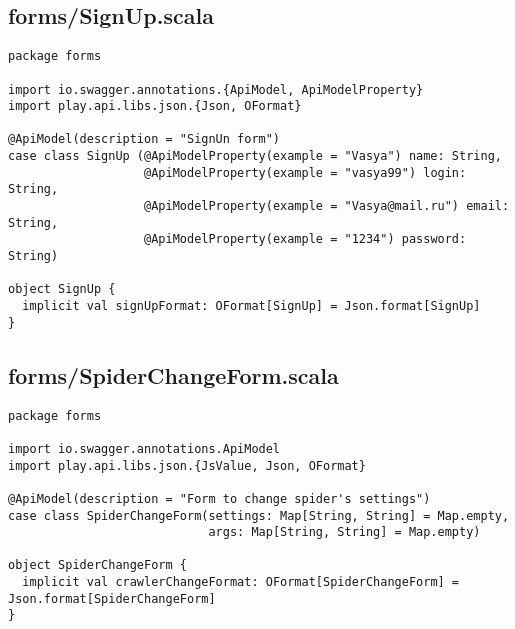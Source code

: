 \subsection{forms/SignUp.scala}
\begin{lstlisting}
package forms

import io.swagger.annotations.{ApiModel, ApiModelProperty}
import play.api.libs.json.{Json, OFormat}

@ApiModel(description = "SignUn form")
case class SignUp (@ApiModelProperty(example = "Vasya") name: String,
                   @ApiModelProperty(example = "vasya99") login: String,
                   @ApiModelProperty(example = "Vasya@mail.ru") email: String,
                   @ApiModelProperty(example = "1234") password: String)

object SignUp {
  implicit val signUpFormat: OFormat[SignUp] = Json.format[SignUp]
}\end{lstlisting}
\subsection{forms/SpiderChangeForm.scala}
\begin{lstlisting}
package forms

import io.swagger.annotations.ApiModel
import play.api.libs.json.{JsValue, Json, OFormat}

@ApiModel(description = "Form to change spider's settings")
case class SpiderChangeForm(settings: Map[String, String] = Map.empty,
                            args: Map[String, String] = Map.empty)

object SpiderChangeForm {
  implicit val crawlerChangeFormat: OFormat[SpiderChangeForm] = Json.format[SpiderChangeForm]
}
\end{lstlisting}

